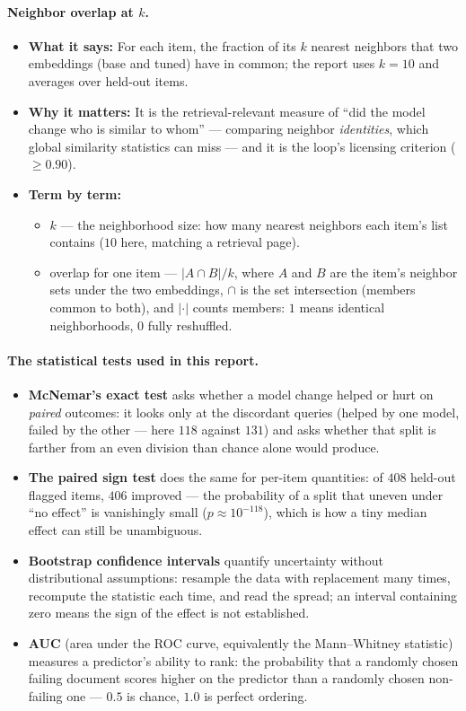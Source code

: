 \documentclass[11pt,letterpaper]{article}
\begin{document}
\paragraph{Neighbor overlap at $k$.}
\begin{itemize}
  \item \textbf{What it says:} For each item, the fraction of its $k$
  nearest neighbors that two embeddings (base and tuned) have in common;
  the report uses $k = 10$ and averages over held-out items.
  \item \textbf{Why it matters:} It is the retrieval-relevant measure of
  ``did the model change who is similar to whom'' --- comparing neighbor
  \emph{identities}, which global similarity statistics can miss --- and it
  is the loop's licensing criterion ($\ge 0.90$).
  \item \textbf{Term by term:}
  \begin{itemize}
    \item $k$ --- the neighborhood size: how many nearest neighbors each
    item's list contains ($10$ here, matching a retrieval page).
    \item overlap for one item --- $|A \cap B| / k$, where $A$ and $B$ are
    the item's neighbor sets under the two embeddings, $\cap$ is the set
    intersection (members common to both), and $|\cdot|$ counts members:
    $1$ means identical neighborhoods, $0$ fully reshuffled.
  \end{itemize}
\end{itemize}

\paragraph{The statistical tests used in this report.}
\begin{itemize}
  \item \textbf{McNemar's exact test} asks whether a model change helped or
  hurt on \emph{paired} outcomes: it looks only at the discordant queries
  (helped by one model, failed by the other --- here $118$ against $131$)
  and asks whether that split is farther from an even division than chance
  alone would produce.
  \item \textbf{The paired sign test} does the same for per-item
  quantities: of $408$ held-out flagged items, $406$ improved --- the
  probability of a split that uneven under ``no effect'' is vanishingly
  small ($p \approx 10^{-118}$), which is how a tiny median effect can
  still be unambiguous.
  \item \textbf{Bootstrap confidence intervals} quantify uncertainty
  without distributional assumptions: resample the data with replacement
  many times, recompute the statistic each time, and read the spread; an
  interval containing zero means the sign of the effect is not established.
  \item \textbf{AUC} (area under the ROC curve, equivalently the
  Mann--Whitney statistic) measures a predictor's ability to rank: the
  probability that a randomly chosen failing document scores higher on the
  predictor than a randomly chosen non-failing one --- $0.5$ is chance,
  $1.0$ is perfect ordering.
\end{itemize}
\end{document}
